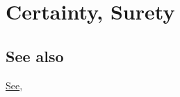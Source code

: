 \section{Certainty, Surety}
	\label{CERTAINTY}
	
\subsection{See also}

	\hyperref[SEE]{See}, 




	



